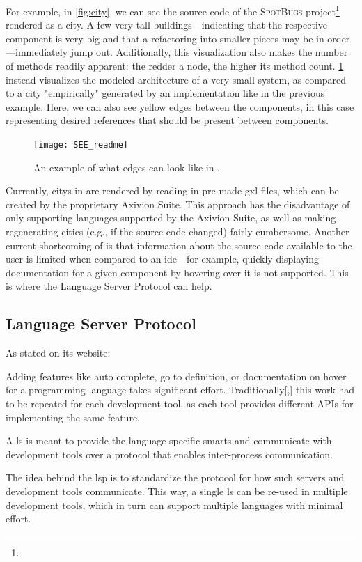 \documentclass[../thesis]{subfiles}
\begin{document}
For example, in \cref{fig:city}, we can see the source code of the \textsc{SpotBugs} project\footnote{} rendered as a \gls{city}.
A few very tall buildings---indicating that the respective component is very big and that a refactoring into smaller pieces may be in order---immediately jump out.
Additionally, this visualization also makes the number of methods readily apparent:
the redder a node, the higher its method count.
\cref{fig:edges} instead visualizes the modeled architecture of a very small system, as compared to a city "empirically" generated by an implementation like in the previous example.
Here, we can also see yellow edges between the components, in this case representing desired references that should be present between components.

\begin{figure}[hbtp]
	\begin{center}
		\texttt{[image: SEE\_readme]}
	\end{center}
	\caption{An example of what edges can look like in \SEE{}. }\label{fig:edges}
\end{figure}

Currently, \glspl{city} in \SEE{} are rendered by reading in pre-made \gls{gxl} files, which can be created by the proprietary Axivion Suite.
This approach has the disadvantage of only supporting languages supported by the Axivion Suite, as well as making regenerating cities (e.g., if the source code changed) fairly cumbersome.
Another current shortcoming of \SEE{} is that information about the source code available to the user is limited when compared to an \gls{ide}---for example, quickly displaying documentation for a given component by hovering over it is not supported.
This is where the Language Server Protocol can help.

\subsection{Language Server Protocol}\label{subsec:lsp}

As stated on its website:
\begin{displayquote}
	Adding features like auto complete, go to definition, or documentation on hover for a programming language takes significant effort. Traditionally[,] this work had to be repeated for each development tool, as each tool provides different APIs for implementing the same feature.

	A \gls*{ls} is meant to provide the language-specific smarts and communicate with development tools over a protocol that enables inter-process communication.

	The idea behind the \gls*{lsp} is to standardize the protocol for how such servers and development tools communicate. This way, a single \gls{ls} can be re-used in multiple development tools, which in turn can support multiple languages with minimal effort.
\end{displayquote}
\end{document}
